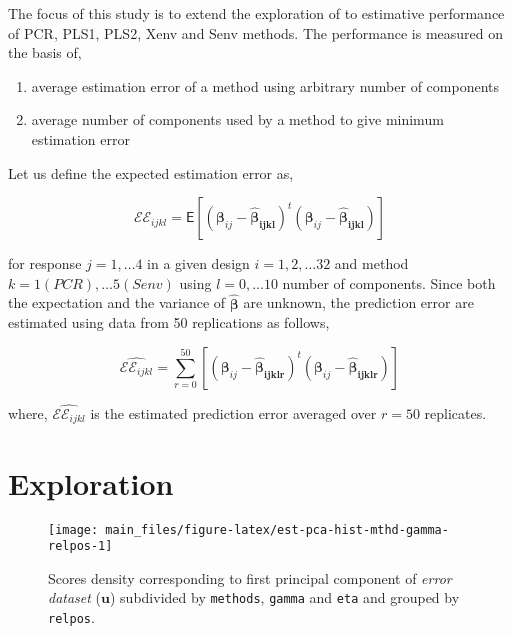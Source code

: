 \documentclass[12pt,3p,authoryear]{elsarticle}
\providecommand{\tightlist}{%
  \setlength{\itemsep}{0pt}\setlength{\parskip}{0pt}}
\begin{document}
The focus of this study is to extend the exploration of
\citet{rimal2019pred} to estimative performance of PCR, PLS1, PLS2, Xenv
and Senv methods. The performance is measured on the basis of,

\begin{enumerate}
\def\labelenumi{\alph{enumi})}
\tightlist
\item
  average estimation error of a method using arbitrary number of
  components
\item
  average number of components used by a method to give minimum
  estimation error
\end{enumerate}

Let us define the expected estimation error as,

\begin{equation}
\mathcal{EE}_{ijkl} =
  \mathsf{E}{\left[\left(\boldsymbol{\beta}_{ij} -
  \boldsymbol{\hat{\beta}_{ijkl}}\right)^t
  \left(\boldsymbol{\beta}_{ij} - \boldsymbol{\hat{\beta}_{ijkl}}\right)\right]}
\label{eq:est-error}
\end{equation}

for response \(j = 1, \ldots 4\) in a given design \(i=1, 2, \ldots 32\)
and method \(k=1(PCR), \ldots 5(Senv)\) using \(l=0, \ldots 10\) number
of components. Since both the expectation and the variance of
\(\hat{\boldsymbol{\beta}}\) are unknown, the prediction error are
estimated using data from 50 replications as follows,

\begin{equation}
\widehat{\mathcal{EE}_{ijkl}} =
  \sum_{r=0}^{50}{\left[\left(\boldsymbol{\beta}_{ij} -
  \boldsymbol{\hat{\beta}_{ijklr}}\right)^t
  \left(\boldsymbol{\beta}_{ij} - \boldsymbol{\hat{\beta}_{ijklr}}\right)\right]}
\label{eq:estimated-est-error}
\end{equation}

where, \(\widehat{\mathcal{EE}_{ijkl}}\) is the estimated prediction
error averaged over \(r=50\) replicates.

\section{Exploration}\label{exploration}





\begin{figure}[!htb]
\texttt{[image: main\_files/figure-latex/est-pca-hist-mthd-gamma-relpos-1]} \caption{Scores density corresponding to first principal component
of \emph{error dataset} (\(\mathbf{u}\)) subdivided by \texttt{methods},
\texttt{gamma} and \texttt{eta} and grouped by \texttt{relpos}.}\label{fig:est-pca-hist-mthd-gamma-relpos}
\end{figure}
\end{document}
